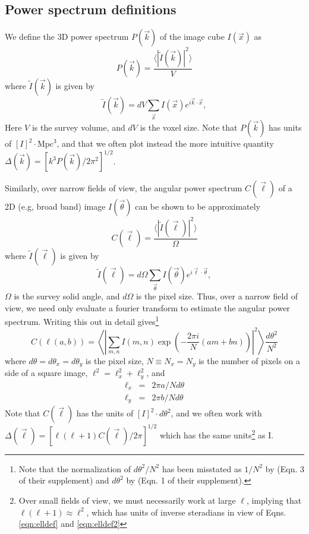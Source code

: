 \documentclass[numberedappendix]{emulateapj}
\begin{document}
\subsection{Power spectrum definitions}
\label{sec:pspecdefs}

We define the 3D power spectrum $P(\vec{k})$ of the image cube $I(\vec{x})$ as 
\begin{equation}
\label{eqn:pspec3Ddef}
	P(\vec{k}) = \frac{\langle|\tilde{I}(\vec{k})|^2\rangle}{V}
\end{equation}
where $\tilde{I}(\vec{k})$ is given by
\begin{equation}
	\tilde{I}(\vec{k})=dV\sum_{\vec{x}}I(\vec{x})e^{i\vec{k}\cdot\vec{x}},
\end{equation}
Here $V$ is the survey volume, and $dV$ is the voxel size. Note that $P(\vec{k})$ has units of $[I]^2\cdot\text{Mpc}^3$, and that we often plot instead the more intuitive quantity $\Delta(\vec{k})=[k^3P(\vec{k})/2\pi^2]^{1/2}$.

Similarly, over narrow fields of view, the angular power spectrum $C(\vec{\ell})$ of a 2D (e.g, broad band) image $I(\vec{\theta})$ can be shown to be approximately
\begin{equation}
\label{eqn:Cldef0}
	C(\vec{\ell}) = \frac{\langle|\tilde{I}(\vec{\ell})|^2\rangle}{\Omega} 
\end{equation}
where $\tilde{I}(\vec{\ell})$ is given by
\begin{equation}
	\tilde{I}(\vec{\ell})=d\Omega\sum_{\vec{\theta}}I(\vec{\theta})e^{i\vec{\ell}\cdot\vec{\theta}},
\end{equation}
$\Omega$ is the survey solid angle, and $d\Omega$ is the pixel size. Thus, over a narrow field of view, we need only evaluate a fourier transform to estimate the angular power spectrum. Writing this out in detail gives\footnote{Note that the normalization of $d\theta^2/N^2$ has been misstated as $1/N^2$ by \citet{zemcov14} (Eqn. 3 of their supplement) and $d\theta^2$ by \citet{cooray12} (Eqn. 1 of their supplement).} 
\begin{equation}
\label{eqn:Cldef}
	C(\ell(a,b))=\left\langle\left|\sum_{m,n}I(m,n)\exp\left(-\frac{2\pi i}{N}  (am+bn)\right)\right|^2\right\rangle\frac{d\theta^2}{N^2}
\end{equation}
where $d\theta=d\theta_x=d\theta_y$ is the pixel size, $N\equiv N_x=N_y$ is the number of pixels on a side of a square image, $\ell^2=\ell_x^2+\ell_y^2$, and 
\begin{eqnarray}
\ell_x&=&2\pi a/N d\theta \label{eqn:elldef}\\
\ell_y&=&2\pi b/Nd\theta \label{eqn:elldef2}
\end{eqnarray}
Note that $C(\vec{\ell})$ has the units of $[I]^2\cdot d\theta^2$, and we often work with $\Delta(\vec{\ell})=[\ell(\ell+1)C(\vec{\ell})/2\pi]^{1/2}$ which has the same units\footnote{Over small fields of view, we must necessarily work at large $\ell$, implying that $\ell(\ell+1)\approx\ell^2$, which has units of inverse steradians in view of Eqns. \ref{eqn:elldef} and \ref{eqn:elldef2}} as I.
\end{document}
